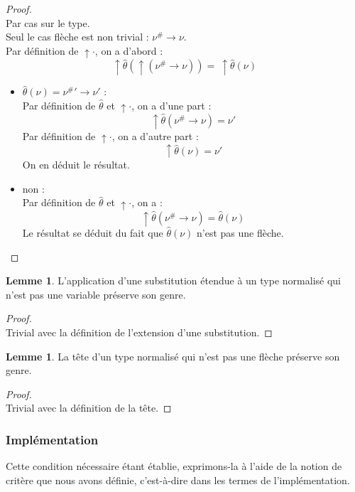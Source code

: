 \documentclass[a4paper]{report}
\newenvironment{preuve} 
	{\begin{proof}~\\} 
	{\end{proof}}
\theoremstyle{definition}
\newtheorem{lemme}[theoreme]{Lemme}
\begin{document}
\begin{preuve}
	Par cas sur le type. \\
	Seul le cas flèche est non trivial : $\nu^\# \rightarrow \nu$. \\
	Par définition de $\uparrow \cdot$, on a d'abord :
	\[ \uparrow \hat\theta (\uparrow (\nu^\# \rightarrow \nu)) =\ \uparrow \hat\theta (\nu) \]
	\begin{itemize}[label={\textbf{Si}}]
		\item 
			$\hat\theta (\nu) = {\nu^\#}' \rightarrow \nu'$ : \\
			Par définition de $\hat\theta$ et $\uparrow \cdot$, on a d'une part :
			\[ \uparrow \hat\theta (\nu^\# \rightarrow \nu) = \nu' \]
			Par définition de $\uparrow \cdot$, on a d'autre part :
			\[ \uparrow \hat\theta (\nu) = \nu' \]
			On en déduit le résultat.
		\item 
			non : \\
			Par définition de $\hat\theta$ et $\uparrow \cdot$, on a :
			\[ \uparrow \hat\theta (\nu^\# \rightarrow \nu) = \hat\theta (\nu) \]
			Le résultat se déduit du fait que $\hat\theta (\nu)$ n'est pas une flèche.
	\end{itemize}
\end{preuve}

\begin{lemme} \label{non_var_implique_subst_preserve_genre}
	L'application d'une substitution étendue à un type normalisé qui n'est pas une variable préserve son genre.
\end{lemme}

\begin{preuve}
	Trivial avec la définition de l'extension d'une substitution.
\end{preuve}

\begin{lemme} \label{non_fleche_implique_tete_preserve_genre}
	La tête d'un type normalisé qui n'est pas une flèche préserve son genre.
\end{lemme}

\begin{preuve}
	Trivial avec la définition de la tête.
\end{preuve}

\subsubsection{Implémentation}

Cette condition nécessaire étant établie, exprimons-la à l'aide de la notion de critère que nous avons définie, c'est-à-dire dans les termes de l'implémentation.
\end{document}
